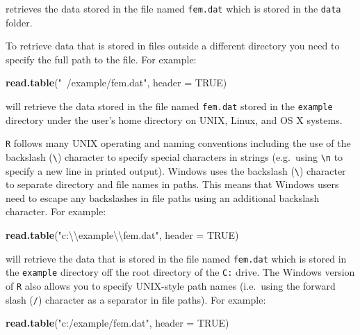 \documentclass[]{book}
\newenvironment{Shaded}{\begin{snugshade}}{\end{snugshade}}
\newcommand{\KeywordTok}[1]{\textcolor[rgb]{0.13,0.29,0.53}{\textbf{#1}}}
\newcommand{\DataTypeTok}[1]{\textcolor[rgb]{0.13,0.29,0.53}{#1}}
\newcommand{\CharTok}[1]{\textcolor[rgb]{0.31,0.60,0.02}{#1}}
\newcommand{\StringTok}[1]{\textcolor[rgb]{0.31,0.60,0.02}{#1}}
\newcommand{\OtherTok}[1]{\textcolor[rgb]{0.56,0.35,0.01}{#1}}
\newcommand{\NormalTok}[1]{#1}
\theoremstyle{definition}
\theoremstyle{definition}
\theoremstyle{definition}
\theoremstyle{remark}
\begin{document}
retrieves the data stored in the file named \texttt{fem.dat} which is
stored in the \texttt{data} folder.

To retrieve data that is stored in files outside a different directory
you need to specify the full path to the file. For example:

\begin{Shaded}
\begin{Highlighting}[]
\KeywordTok{read.table}\NormalTok{(}\StringTok{"~/example/fem.dat"}\NormalTok{, }\DataTypeTok{header =} \OtherTok{TRUE}\NormalTok{)}
\end{Highlighting}
\end{Shaded}

will retrieve the data stored in the file named \texttt{fem.dat} stored
in the \texttt{example} directory under the user's home directory on
UNIX, Linux, and OS X systems.

\texttt{R} follows many UNIX operating and naming conventions including
the use of the backslash (\texttt{\textbackslash{}}) character to
specify special characters in strings (e.g.~using
\texttt{\textbackslash{}n} to specify a new line in printed output).
Windows uses the backslash (\texttt{\textbackslash{}}) character to
separate directory and file names in paths. This means that Windows
users need to escape any backslashes in file paths using an additional
backslash character. For example:

\begin{Shaded}
\begin{Highlighting}[]
\KeywordTok{read.table}\NormalTok{(}\StringTok{"c:}\CharTok{\textbackslash{}\textbackslash{}}\StringTok{example}\CharTok{\textbackslash{}\textbackslash{}}\StringTok{fem.dat"}\NormalTok{, }\DataTypeTok{header =} \OtherTok{TRUE}\NormalTok{)}
\end{Highlighting}
\end{Shaded}

will retrieve the data that is stored in the file named \texttt{fem.dat}
which is stored in the \texttt{example} directory off the root directory
of the \texttt{C:} drive. The Windows version of \texttt{R} also allows
you to specify UNIX-style path names (i.e.~using the forward slash
(\texttt{/}) character as a separator in file paths). For example:

\begin{Shaded}
\begin{Highlighting}[]
\KeywordTok{read.table}\NormalTok{(}\StringTok{"c:/example/fem.dat"}\NormalTok{, }\DataTypeTok{header =} \OtherTok{TRUE}\NormalTok{)}
\end{Highlighting}
\end{Shaded}
\end{document}
